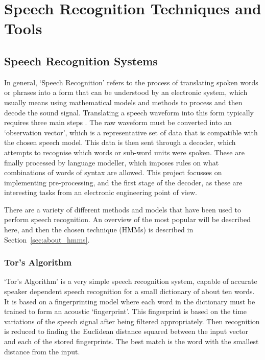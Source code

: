 \chapter{Speech Recognition Techniques and Tools} %
\label{cha:background}


\section{Speech Recognition Systems} %
\label{sec:speech_recognition_systems}
	In general, `Speech Recognition' refers to the process of translating spoken words or phrases into a form that can be understood by an electronic system, which usually means using mathematical models and methods to process and then decode the sound signal.  Translating a speech waveform into this form typically requires three main steps \cite{melnikoff2003speech}.  The raw waveform must be converted into an `observation vector', which is a representative set of data that is compatible with the chosen speech model.  This data is then sent through a decoder, which attempts to recognise which words or sub-word units were spoken.  These are finally processed by language modeller, which imposes rules on what combinations of words of syntax are allowed.  This project focusses on implementing pre-processing, and the first stage of the decoder, as these are interesting tasks from an electronic engineering point of view.

	There are a variety of different methods and models that have been used to perform speech recognition.  An overview of the most popular will be described here, and then the chosen technique (HMMs) is described in Section~\ref{sec:about_hmms}.

	\subsection{Tor's Algorithm} %
	\label{sub:tors_algorithm}
		`Tor's Algorithm'\cite{tor2003} is a very simple speech recognition system, capable of accurate speaker dependent speech recognition for a small dictionary of about ten words.  It is based on a fingerprinting model where each word in the dictionary must be trained to form an acoustic `fingerprint'.  This fingerprint is based on the time variations of the speech signal after being filtered appropriately.  Then recognition is reduced to finding the Euclidean distance squared between the input vector and each of the stored fingerprints.  The best match is the word with the smallest distance from the input.
		
